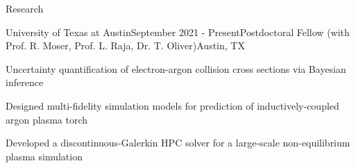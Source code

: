 \documentclass{resume} %
\begin{document}
\begin{rSection}{Research}

\begin{rSubsection}{University of Texas at Austin}{September 2021 - Present}{Postdoctoral Fellow \textnormal{(with Prof. R. Moser, Prof. L. Raja, Dr. T. Oliver)}}{Austin, TX}
\item Uncertainty quantification of electron-argon collision cross sections via Bayesian inference
\item Designed multi-fidelity simulation models for prediction of inductively-coupled argon plasma torch
\item Developed a discontinuous-Galerkin HPC solver for a large-scale non-equilibrium plasma simulation
\end{rSubsection}


\end{rSection}
\end{document}
